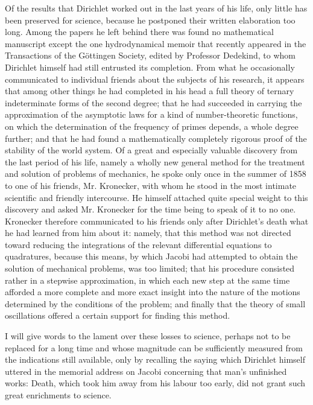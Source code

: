 \documentclass[11pt]{article}
\begin{document}
Of the results that Dirichlet worked out in the last years of his life, only little has been preserved for science, because he postponed their written elaboration too long. Among the papers he left behind there was found no mathematical manuscript except the one hydrodynamical memoir that recently appeared in the Transactions of the Göttingen Society, edited by Professor Dedekind, to whom Dirichlet himself had still entrusted its completion. From what he occasionally communicated to individual friends about the subjects of his research, it appears that among other things he had completed in his head a full theory of ternary indeterminate forms of the second degree; that he had succeeded in carrying the approximation of the asymptotic laws for a kind of number-theoretic functions, on which the determination of the frequency of primes depends, a whole degree further; and that he had found a mathematically completely rigorous proof of the stability of the world system. Of a great and especially valuable discovery from the last period of his life, namely a wholly new general method for the treatment and solution of problems of mechanics, he spoke only once in the summer of 1858 to one of his friends, Mr. Kronecker, with whom he stood in the most intimate scientific and friendly intercourse. He himself attached quite special weight to this discovery and asked Mr. Kronecker for the time being to speak of it to no one. Kronecker therefore communicated to his friends only after Dirichlet's death what he had learned from him about it: namely, that this method was not directed toward reducing the integrations of the relevant differential equations to quadratures, because this means, by which Jacobi had attempted to obtain the solution of mechanical problems, was too limited; that his procedure consisted rather in a stepwise approximation, in which each new step at the same time afforded a more complete and more exact insight into the nature of the motions determined by the conditions of the problem; and finally that the theory of small oscillations offered a certain support for finding this method.

I will give words to the lament over these losses to science, perhaps not to be replaced for a long time and whose magnitude can be sufficiently measured from the indications still available, only by recalling the saying which Dirichlet himself uttered in the memorial address on Jacobi concerning that man's unfinished works: Death, which took him away from his labour too early, did not grant such great enrichments to science.
\end{document}
